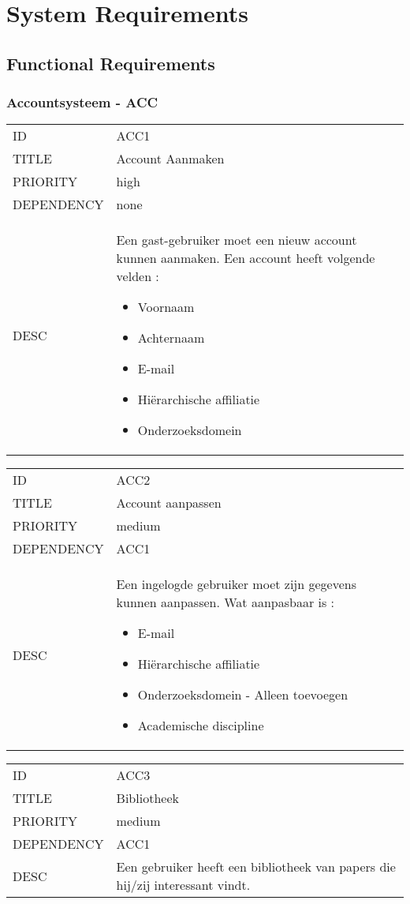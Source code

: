 \section{System Requirements}

\subsection{Functional Requirements}

\subsubsection{Accountsysteem - ACC}

\begin{longtable}{lp{10cm}}
ID           & ACC1\\
TITLE        & Account Aanmaken \\
PRIORITY     & high \\
DEPENDENCY   & none \\
DESC         & Een gast-gebruiker moet een nieuw account kunnen aanmaken.
Een account heeft volgende velden :
\begin{itemize}
  \item Voornaam
  \item Achternaam
  \item E-mail
  \item Hiërarchische affiliatie
  \item Onderzoeksdomein
\end{itemize}     
\end{longtable}

\begin{longtable}{lp{10cm}}
ID           & ACC2\\
TITLE        & Account aanpassen\\
PRIORITY     & medium\\
DEPENDENCY   & ACC1\\
DESC         & Een ingelogde gebruiker moet zijn gegevens kunnen aanpassen.
Wat aanpasbaar is :
\begin{itemize}
  \item E-mail
  \item Hiërarchische affiliatie
  \item Onderzoeksdomein - Alleen toevoegen
  \item Academische discipline
\end{itemize}     
\end{longtable}

\begin{longtable}{lp{10cm}}
ID           & ACC3\\
TITLE        & Bibliotheek\\
PRIORITY     & medium\\
DEPENDENCY   & ACC1\\
DESC         & Een gebruiker heeft een bibliotheek van papers die hij/zij interessant vindt.     
\end{longtable}

